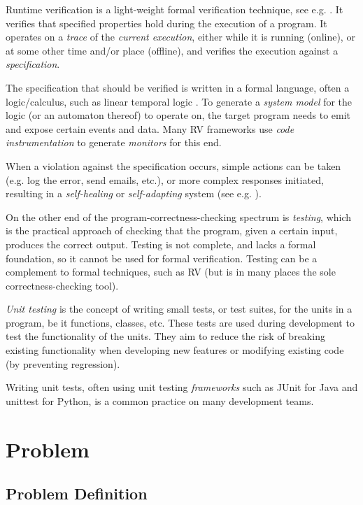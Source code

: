 \documentclass[a4paper,11pt]{article}
\begin{document}
Runtime verification is a light-weight formal verification technique, see e.g. \cite{leucker08,delgado04}.
It verifies that specified properties hold during the execution of a program. It operates on a \emph{trace} of the \emph{current execution}, either while it is running (online), or at some other time and/or place (offline), and verifies the execution against a \emph{specification}.

The specification that should be verified is written in a formal
language, often a logic/calculus, such as linear temporal logic \cite{pnueli77}. To generate
a \emph{system model} for the logic (or an automaton thereof) to operate on, the target program
needs to emit and expose certain events and data. Many RV frameworks use \textit{code instrumentation}
to generate \textit{monitors} for this end.

When a violation against the specification occurs, simple actions can be taken (e.g. log the error, send emails, etc.), or more complex responses initiated, resulting in a \textit{self-healing} or \textit{self-adapting} system (see e.g. \cite{huebscher08}).

On the other end of the program-correctness-checking spectrum is \emph{testing}, which is the
practical approach of checking that the program, given a certain input, produces the correct output.
Testing is not complete, and lacks a formal foundation, so it cannot be used for formal verification. 
Testing can be a complement to formal techniques, such as RV (but is in many places the sole correctness-checking tool).

\textit{Unit testing} is the concept of writing small tests, or test suites, for the units in
a program, be it functions, classes, etc. These tests are used during development to test the 
functionality of the units. They aim to reduce the risk of breaking existing functionality when 
developing new features or modifying existing code (by preventing regression).

Writing unit tests, often using unit testing \textit{frameworks} such as JUnit \cite{junit}
for Java and unittest \cite{python-unittest} for Python, is a common practice on many
development teams.


\section{Problem}

\subsection{Problem Definition}
\end{document}
